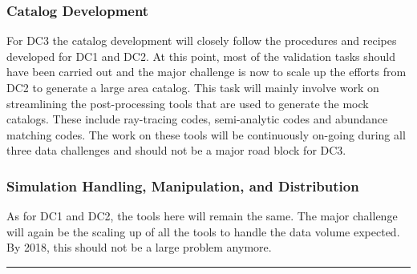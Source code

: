\subsubsection{Catalog Development}
\label{sec:keysims:dc3:dev}

For DC3 the catalog development will closely follow the procedures and recipes developed for DC1 and DC2. At this point, most of the validation tasks should have been carried out and the major challenge is now to scale up the efforts from DC2 to generate a large area catalog. This task will mainly involve work on streamlining the post-processing tools that are used to generate the mock catalogs. These include ray-tracing codes, semi-analytic codes and abundance matching codes. The work on these tools will be continuously on-going during all three data challenges and should not be a major road block for DC3.

\subsubsection{Simulation Handling, Manipulation, and Distribution}
\label{sec:keysims:dc3:handling}

As for DC1 and DC2, the tools here will remain the same. The major challenge will again be the scaling up of all the tools to handle the data volume expected. By 2018, this should not be a large problem anymore. 



\vspace{\baselineskip}
\hrule
\clearpage
